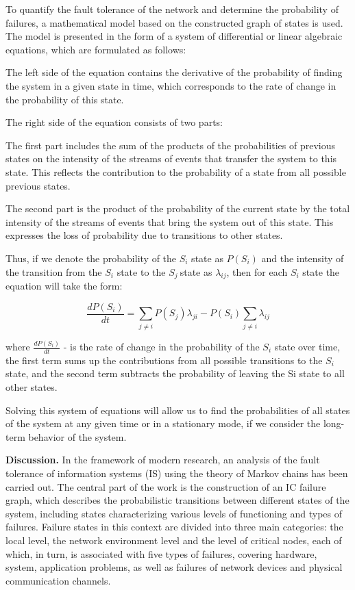 \begin{multicols}{2}
To quantify the fault tolerance of the network and determine the
probability of failures, a mathematical model based on the constructed
graph of states is used. The model is presented in the form of a system
of differential or linear algebraic equations, which are formulated as
follows:

The left side of the equation contains the derivative of the probability
of finding the system in a given state in time, which corresponds to the
rate of change in the probability of this state.

The right side of the equation consists of two parts:

The first part includes the sum of the products of the probabilities of
previous states on the intensity of the streams of events that transfer
the system to this state. This reflects the contribution to the
probability of a state from all possible previous states.

The second part is the product of the probability of the current state
by the total intensity of the streams of events that bring the system
out of this state. This expresses the loss of probability due to
transitions to other states.

Thus, if we denote the probability of the \(S_{i}\) state as
\(P(S_{i})\) and the intensity of the transition from the \(S_{i}\)
state to the \(S_{j}\ \)state as \(\lambda_{ij}\), then for each
\(S_{i}\) state the equation will take the form:

\[\frac{dP(S_{i})}{dt} = \sum_{j \neq i}^{}{P(S_{j})}\lambda_{ji} - P(S_{i})\sum_{j \neq i}^{}\lambda_{ij}\]

where \(\frac{dP(S_{i})}{dt}\) - is the rate of change in the
probability of the \(S_{i}\) state over time, the first term sums up the
contributions from all possible transitions to the \(S_{i}\) state, and
the second term subtracts the probability of leaving the Si state to all
other states.

Solving this system of equations will allow us to find the probabilities
of all states of the system at any given time or in a stationary mode,
if we consider the long-term behavior of the system.

{\bfseries Discussion.} In the framework of modern research, an analysis of
the fault tolerance of information systems (IS) using the theory of
Markov chains has been carried out. The central part of the work is the
construction of an IC failure graph, which describes the probabilistic
transitions between different states of the system, including states
characterizing various levels of functioning and types of failures.
Failure states in this context are divided into three main categories:
the local level, the network environment level and the level of critical
nodes, each of which, in turn, is associated with five types of
failures, covering hardware, system, application problems, as well as
failures of network devices and physical communication channels.


\end{multicols}
